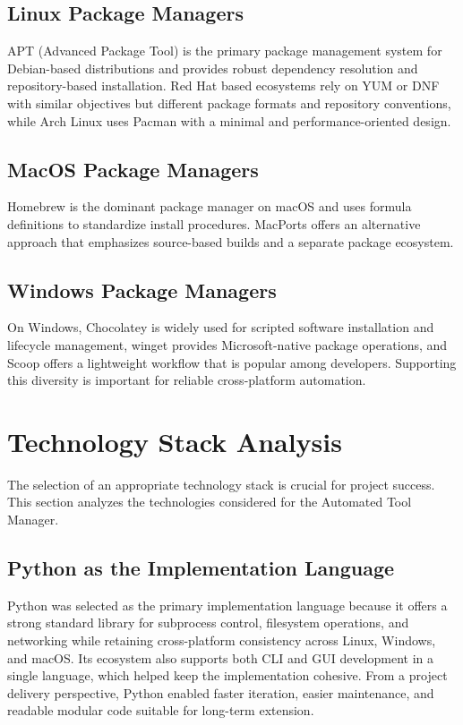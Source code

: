 \documentclass[12pt,a4paper]{report}
\begin{document}
\subsection{Linux Package Managers}
APT (Advanced Package Tool) is the primary package management system for Debian-based distributions and provides robust dependency resolution and repository-based installation. Red Hat based ecosystems rely on YUM or DNF with similar objectives but different package formats and repository conventions, while Arch Linux uses Pacman with a minimal and performance-oriented design.

\subsection{MacOS Package Managers}
Homebrew is the dominant package manager on macOS and uses formula definitions to standardize install procedures. MacPorts offers an alternative approach that emphasizes source-based builds and a separate package ecosystem.

\subsection{Windows Package Managers}
On Windows, Chocolatey is widely used for scripted software installation and lifecycle management, winget provides Microsoft-native package operations, and Scoop offers a lightweight workflow that is popular among developers. Supporting this diversity is important for reliable cross-platform automation.

\section{Technology Stack Analysis}
The selection of an appropriate technology stack is crucial for project success. This section analyzes the technologies considered for the Automated Tool Manager.

\subsection{Python as the Implementation Language}
Python was selected as the primary implementation language because it offers a strong standard library for subprocess control, filesystem operations, and networking while retaining cross-platform consistency across Linux, Windows, and macOS. Its ecosystem also supports both CLI and GUI development in a single language, which helped keep the implementation cohesive. From a project delivery perspective, Python enabled faster iteration, easier maintenance, and readable modular code suitable for long-term extension.
\end{document}
